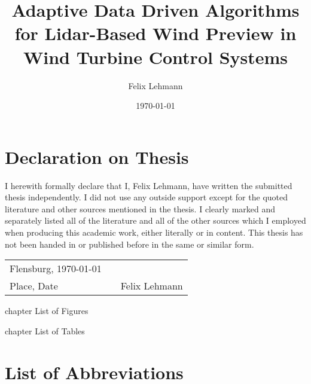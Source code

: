 \documentclass[a4paper, 12pt, bibtotoc, toc=chapterentrywithdots, hyphens, numbers=noenddot]{scrreprt}
\title{Adaptive Data Driven Algorithms for Lidar-Based Wind Preview in Wind Turbine Control Systems}
\author{Felix Lehmann}
\date{\today}
\begin{document}
\pagestyle{empty}



\chapter*{Declaration on Thesis}
\thispagestyle{Preamble}

I herewith formally declare that I, Felix Lehmann, have written the submitted thesis independently. I did not use any outside support except for the quoted literature and other sources mentioned in the thesis. I clearly marked and separately listed all of the literature and all of the other sources which I employed when producing this academic work, either literally or in content. This thesis has not been handed in or published before in the same or similar form.

\vspace{4cm}

\begin{tabular}[h]{l p{2cm} p{7cm}}
Flensburg, \today &  & \\
\cline{1-1}\cline{3-3}
{\small Place, Date}& & {\small Felix Lehmann}\\
\end{tabular}


\newpage
{}
\tableofcontents
\thispagestyle{Preamble}

\newpage
\listoffigures
\thispagestyle{Preamble}
 {chapter} {List of Figures}

\newpage
\listoftables
\thispagestyle{Preamble}
 {chapter} {List of Tables}

\newpage
\chapter*{List of Abbreviations}
\thispagestyle{Preamble}
\printglossary[type=\acronymtype, style=long]
\end{document}
